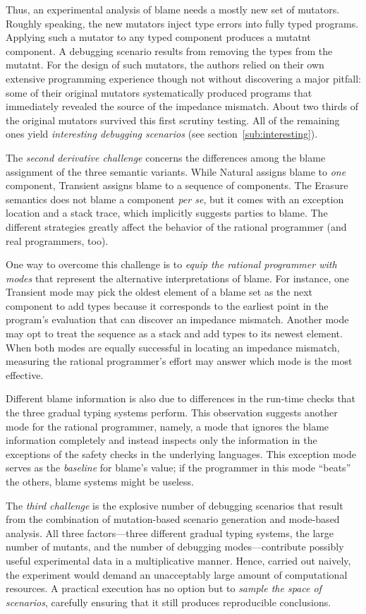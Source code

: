 Thus, an experimental analysis of blame needs a mostly new set of mutators.
Roughly speaking, the new mutators inject type errors into fully typed programs.
Applying such a mutator to any typed component produces a mutatnt component.  A
debugging scenario results from removing the types from the mutatnt. For the
design of such mutators, the authors relied on their own extensive programming
experience though not without discovering a major pitfall: some of their
original mutators systematically produced programs that immediately revealed the
source of the impedance mismatch. About two thirds of the original mutators
survived this first scrutiny testing. All of the remaining ones yield {\em
interesting debugging scenarios\/} (see section~\ref{sub:interesting}).

The {\em second derivative challenge\/} concerns the differences among the blame
assignment of the three semantic variants.  While Natural assigns blame to {\em
one\/} component, Transient assigns blame to a sequence of components. The
Erasure semantics does not blame a component {\it per se\/}, but it comes with
an exception location and a stack trace, which implicitly suggests parties to
blame.  The different strategies greatly affect the behavior of the rational
programmer (and real programmers, too).

One way to overcome this challenge is to {\em equip the rational programmer with
modes \/} that represent the alternative interpretations of blame.  For
instance, one Transient mode may pick the oldest element of a blame set as
the next component to add types because it corresponds to the earliest point in
the program's evaluation that can discover an impedance mismatch.  Another mode
may opt to treat the sequence as a stack and add types to its newest element.
When both modes are equally successful in locating an impedance mismatch,
measuring the rational programmer's effort may answer which mode is the most
effective.

Different blame information is also due to differences in the run-time checks
that the three gradual typing systems perform. This observation suggests another
mode for the rational programmer, namely, a mode that ignores the blame
information completely and instead inspects only the information in the
exceptions of the safety checks in the underlying languages.  This exception
mode serves as the {\em baseline\/} for blame's value; if the programmer in this
mode ``beats'' the others, blame systems might be useless.

The {\em third challenge\/} is the explosive number of debugging scenarios that
result from the combination of mutation-based scenario generation and mode-based
analysis. All three factors---three different gradual typing systems, the large
number of mutants, and the number of debugging modes---contribute possibly
useful experimental data in a multiplicative manner. Hence, carried out naively,
the experiment would demand an unacceptably large amount of computational
resources.  A practical execution has no option but to {\em sample the space of
scenarios\/}, carefully ensuring that it still produces reproducible
conclusions.

